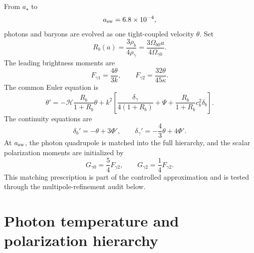 From $a_\star$ to
\begin{equation}
 a_{\rm sw}=6.8\times10^{-4},
 \label{eq:pcmb-tight-switch}
\end{equation}
photons and baryons are evolved as one tight-coupled velocity $\theta$.  Set
\begin{equation}
 R_b(a)=\frac{3\rho_b}{4\rho_\gamma}
 =\frac{3\Omega_{b0}a}{4\Omega_{\gamma0}}.
 \label{eq:pcmb-baryon-loading}
\end{equation}
The leading brightness moments are
\begin{equation}
 F_{\gamma1}=\frac{4\theta}{3k},
 \qquad
 F_{\gamma2}=\frac{32\theta}{45\dot\kappa}.
 \label{eq:pcmb-tight-brightness}
\end{equation}
The common Euler equation is
\begin{equation}
 \theta'
 =-\mathcal H\frac{R_b}{1+R_b}\theta
 +k^2\left[
 \frac{\delta_\gamma}{4(1+R_b)}
 +\Psi
 +\frac{R_b}{1+R_b}c_b^2\delta_b
 \right].
 \label{eq:pcmb-tight-euler}
\end{equation}
The continuity equations are
\begin{equation}
 \delta_b'=-\theta+3\Phi',
 \qquad
 \delta_\gamma'=-\frac43\theta+4\Phi'.
 \label{eq:pcmb-tight-continuity}
\end{equation}
At $a_{\rm sw}$, the photon quadrupole is matched into the full hierarchy, and the scalar polarization moments are initialized by
\begin{equation}
 G_{\gamma0}=\frac54F_{\gamma2},
 \qquad
 G_{\gamma2}=\frac14F_{\gamma2}.
 \label{eq:pcmb-polarization-matching}
\end{equation}
This matching prescription is part of the controlled approximation and is tested through the multipole-refinement audit below.

\section{Photon temperature and polarization hierarchy}


